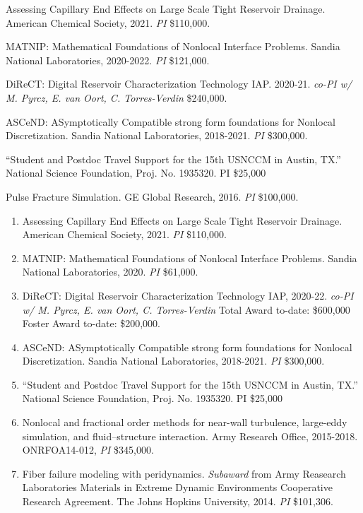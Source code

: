 \begin{etaremune}
    \item Assessing Capillary End Effects on Large Scale Tight Reservoir Drainage.  American Chemical Society, 2021. \textit{PI} \$110,000.
    \item MATNIP: Mathematical Foundations of Nonlocal Interface Problems. Sandia National Laboratories, 2020-2022. \textit{PI} \$121,000. 
    \item DiReCT: Digital Reservoir Characterization Technology IAP. 2020-21. \textit{co-PI w/ M. Pyrcz, E. van Oort, C. Torres-Verdin} \$240,000.
    \item ASCeND: ASymptotically Compatible strong form foundations for Nonlocal Discretization. Sandia National Laboratories, 2018-2021. \textit{PI} \$300,000.
    \item ``Student and Postdoc Travel Support for the 15th USNCCM in Austin, TX.''  National Science Foundation, Proj. No. 1935320. PI \$25,000
    \item Pulse Fracture Simulation. GE Global Research, 2016. \textit{PI} \$100,000.
\else
\begin{enumerate}
\fi
    \item Assessing Capillary End Effects on Large Scale Tight Reservoir Drainage.  American Chemical Society, 2021. \textit{PI} \$110,000.
  \item MATNIP: Mathematical Foundations of Nonlocal Interface Problems. Sandia National Laboratories, 2020. \textit{PI} \$61,000. 
    \item DiReCT: Digital Reservoir Characterization Technology IAP, 2020-22. \textit{co-PI w/ M. Pyrcz, E. van Oort, C. Torres-Verdin} Total Award to-date: \$600,000 Foster Award to-date: \$200,000.
  \item ASCeND: ASymptotically Compatible strong form foundations for Nonlocal Discretization. Sandia National Laboratories, 2018-2021. \textit{PI} \$300,000.
    \item ``Student and Postdoc Travel Support for the 15th USNCCM in Austin, TX.''  National Science Foundation, Proj. No. 1935320. PI \$25,000
  \item Nonlocal and fractional order methods for near-wall turbulence, large-eddy simulation, and fluid--structure interaction. Army Research Office, 2015-2018. ONRFOA14-012, \textit{PI} {\$}345,000.
  \item Fiber failure modeling with peridynamics. \textit{Subaward} from Army Reasearch Laboratories Materials in Extreme Dynamic Environments Cooperative Research Agreement.  The Johns Hopkins University, 2014. \textit{PI} \$101,306.

\end{enumerate}
\end{etaremune}
